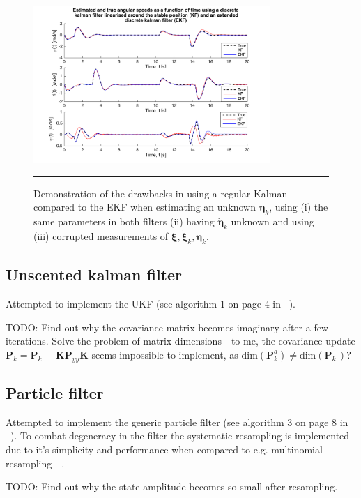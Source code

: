 \documentclass{article}
\begin{document}
\begin{figure}[htbp]
\centering
\includegraphics[width=0.8\textwidth]{figures/kalman-EKF.png}
\rule{35em}{0.5pt}
\caption{Demonstration of the drawbacks in using a regular Kalman compared to the EKF when estimating an unknown $\dot{\boldsymbol\eta}_k$, using (i) the same parameters in both filters (ii) having $\dot{\boldsymbol\eta}_k$ unknown and using (iii) corrupted measurements of $\boldsymbol\xi, \dot{\boldsymbol\xi}_k, \boldsymbol\eta_k$.}
\label{fig:KF-EKF}
\end{figure}

\subsection{Unscented kalman filter}
Attempted to implement the UKF (see algorithm 1 on page 4 in ~\cite{wan2000unscented}).

TODO: Find out why the covariance matrix becomes imaginary after a few iterations. Solve the problem of matrix dimensions - to me, the covariance update $\mathbf{P}_k = \mathbf{P}^-_k - \mathbf{K}\mathbf{P}_{yy}\mathbf{K}$ seems impossible to implement, as $ \text{dim}(\mathbf{P}^a_k)\neq \text{dim}(\mathbf{P}^-_k)$?

\subsection{Particle filter}
Attempted to implement the generic particle filter (see algorithm 3 on page 8 in ~\cite{arulampalam2002tutorial}). To combat degeneracy in the filter the systematic resampling is implemented due to it's simplicity and performance when compared to e.g. multinomial resampling~\cite{douc2005comparison}~\cite{hol2006resampling}.

TODO: Find out why the state amplitude becomes so small after resampling.
\end{document}
